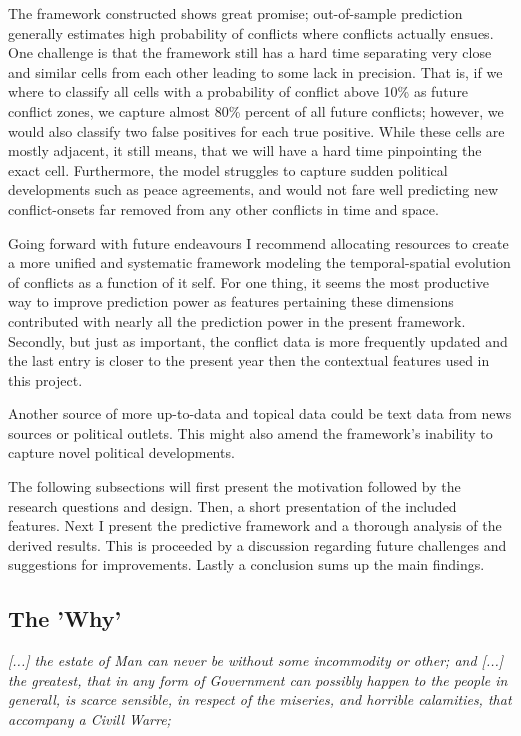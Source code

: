 \documentclass[a4paper]{article}
\begin{document}
The framework constructed shows great promise; out-of-sample prediction generally estimates high probability of conflicts where conflicts actually ensues. One challenge is that the framework still has a hard time separating very close and similar cells from each other leading to some lack in precision. That is, if we where to classify all cells with a probability of conflict above 10\% as future conflict zones, we capture almost 80\% percent of all future conflicts; however, we would also classify two false positives for each true positive. While these cells are mostly adjacent, it still means, that we will have a hard time pinpointing the exact cell. Furthermore, the model struggles to capture sudden political developments such as peace agreements, and would not fare well predicting new conflict-onsets far removed from any other conflicts in time and space.\par

Going forward with future endeavours I recommend allocating resources to create a more unified and systematic framework modeling the temporal-spatial evolution of conflicts as a function of it self. For one thing, it seems the most productive way to improve prediction power as features pertaining these dimensions contributed with nearly all the prediction power in the present framework. Secondly, but just as important, the conflict data is more frequently updated and the last entry is closer to the present year then the contextual features used in this project.\par

Another source of more up-to-data and topical data could be text data from news sources or political outlets. This might also amend the framework's inability to capture novel political developments.\par

The following subsections will first present the motivation followed by the research questions and design. Then, a short presentation of the included features. Next I present the predictive framework and a thorough analysis of the derived results. This is proceeded by a discussion regarding future challenges and suggestions for improvements. Lastly a conclusion sums up the main findings.\par

\subsection{The 'Why'}

\begin{displayquote}
\emph{[...] the estate of Man can never be without some incommodity or other; and [...] the greatest, that in any form of Government can possibly happen to the people in generall, is scarce sensible, in respect of the miseries, and horrible calamities, that accompany a Civill Warre;} \cite[128]{Hobbes_1991} \par

\end{displayquote}
\end{document}
